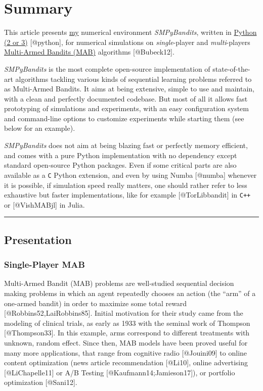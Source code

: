 \hypertarget{summary}{%
\section{Summary}\label{summary}}

This article presents \href{https://perso.crans.org/besson/}{my}
numerical environment \emph{SMPyBandits}, written in
\href{https://www.python.org/}{Python (2 or 3)} {[}@python{]}, for
numerical simulations on \emph{single}-player and \emph{multi}-players
\href{https://en.wikipedia.org/wiki/Multi-armed_bandit}{Multi-Armed
Bandits (MAB)} algorithms {[}@Bubeck12{]}.

\emph{SMPyBandits} is the most complete open-source implementation of
state-of-the-art algorithms tackling various kinds of sequential
learning problems referred to as Multi-Armed Bandits. It aims at being
extensive, simple to use and maintain, with a clean and perfectly
documented codebase. But most of all it allows fast prototyping of
simulations and experiments, with an easy configuration system and
command-line options to customize experiments while starting them (see
below for an example).

\emph{SMPyBandits} does not aim at being blazing fast or perfectly
memory efficient, and comes with a pure Python implementation with no
dependency except standard open-source Python packages. Even if some
critical parts are also available as a \texttt{C} Python extension, and
even by using Numba {[}@numba{]} whenever it is possible, if simulation
speed really matters, one should rather refer to less exhaustive but
faster implementations, like for example {[}@TorLibbandit{]} in
\texttt{C++} or {[}@VishMABjl{]} in Julia.

\begin{center}\rule{0.5\linewidth}{\linethickness}\end{center}

\hypertarget{presentation}{%
\subsection{Presentation}\label{presentation}}

\hypertarget{single-player-mab}{%
\subsubsection{Single-Player MAB}\label{single-player-mab}}

Multi-Armed Bandit (MAB) problems are well-studied sequential decision
making problems in which an agent repeatedly chooses an action (the
``arm'' of a one-armed bandit) in order to maximize some total reward
{[}@Robbins52,LaiRobbins85{]}. Initial motivation for their study came
from the modeling of clinical trials, as early as 1933 with the seminal
work of Thompson {[}@Thompson33{]}. In this example, arms correspond to
different treatments with unknown, random effect. Since then, MAB models
have been proved useful for many more applications, that range from
cognitive radio {[}@Jouini09{]} to online content optimization (news
article recommendation {[}@Li10{]}, online advertising
{[}@LiChapelle11{]} or A/B Testing {[}@Kaufmann14;Jamieson17{]}), or
portfolio optimization {[}@Sani12{]}.

